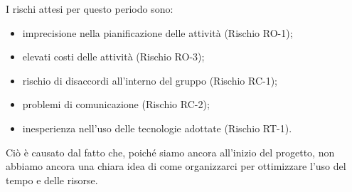 I rischi attesi per questo periodo sono:
\begin{itemize}
	\item imprecisione nella pianificazione delle attività (Rischio RO-1);
	\item elevati costi delle attività (Rischio RO-3);
	\item rischio di disaccordi all'interno del gruppo (Rischio RC-1);
	\item problemi di comunicazione (Rischio RC-2);
	\item inesperienza nell'uso delle tecnologie adottate (Rischio RT-1).
\end{itemize}
Ciò è causato dal fatto che, poiché siamo ancora all'inizio del progetto, non abbiamo ancora una chiara idea di come organizzarci per ottimizzare l'uso del tempo e delle risorse.

